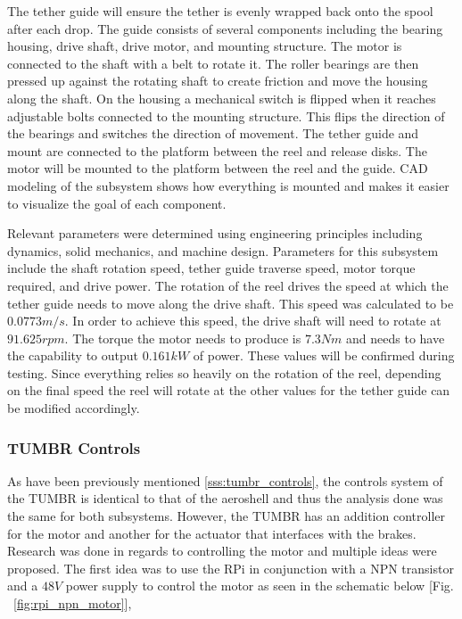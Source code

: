 \indent\indent The tether guide will ensure the tether is evenly wrapped back onto the spool after each drop. The guide consists of several components including the bearing housing, drive shaft, drive motor, and mounting structure. The motor is connected to the shaft with a belt to rotate it. The roller bearings are then pressed up against the rotating shaft to create friction and move the housing along the shaft. On the housing a mechanical switch is flipped when it reaches adjustable bolts connected to the mounting structure. This flips the direction of the bearings and switches the direction of movement. The tether guide and mount are connected to the platform between the reel and release disks. The motor will be mounted to the platform between the reel and the guide. CAD modeling of the subsystem shows how everything is mounted and makes it easier to visualize the goal of each component.

\indent\indent Relevant parameters were determined using engineering principles including dynamics, solid mechanics, and machine design. Parameters for this subsystem include the shaft rotation speed, tether guide traverse speed, motor torque required, and drive power. The rotation of the reel drives the speed at which the tether guide needs to move along the drive shaft. This speed was calculated to be $0.0773 m/s$. In order to achieve this speed, the drive shaft will need to rotate at $91.625 rpm$. The torque the motor needs to produce is $7.3 Nm$ and needs to have the capability to output $0.161 kW$ of power. These values will be confirmed during testing. Since everything relies so heavily on the rotation of the reel, depending on the final speed the reel will rotate at the other values for the tether guide can be modified accordingly. 



\subsubsection{TUMBR Controls}

\indent\indent As have been previously mentioned \ref{sss:tumbr_controls}, the controls system of the TUMBR is identical to that of the aeroshell and thus the analysis done was the same for both subsystems. However, the TUMBR has an addition controller for the motor and another for the actuator that interfaces with the brakes.
Research was done in regards to controlling the motor and multiple ideas were proposed. The first idea was to use the RPi in conjunction with a NPN transistor and a $48V$ power supply to control the motor as seen in the schematic below [Fig. ~\ref{fig:rpi_npn_motor}],


